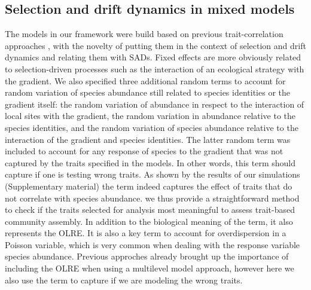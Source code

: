 \documentclass[12pt]{article}
\begin{document}

\subsection*{Selection and drift dynamics in mixed models }

The models in our framework were build based on previous trait-correlation approaches \citep{Pollock2012, Jamil2013, Jamil2013a, Miller2019, TerBraak2019}, with the novelty of putting them in the context of selection and drift dynamics and relating them with SADs. Fixed effects are more obviously related to selection-driven processes such as the interaction of an ecological strategy with the gradient. We also specified three additional random terms to account for random variation of species abundance still related to species identities or the gradient itself: the random variation of abundance in respect to the interaction of local sites with the gradient, the random variation in abundance relative to the species identities, and the random variation of species abundance relative to the interaction of the gradient and species identities. The latter random term  was included to account for any response of species to the gradient that was not captured by the traits specified in the models. In other words, this term should capture if one is testing wrong traits. As shown by the results of our simulations (Supplementary material) the term indeed captures the effect of traits that do not correlate with species abundance.
we thus provide a straightforward method to check if the traits selected for analysis most meaningful to assess trait-based community assembly. In addition to the biological meaning of the term, it also represents the OLRE.
It is also a key term to account for overdispersion in a Poisson variable, which is very common when dealing with the response variable species abundance. Previous approches \citep{Miller2019, TerBraak2019} already brought up the importance of including the OLRE when using a multilevel model approach, however here we also use the term to capture if we are modeling the wrong traits. 
\end{document}
